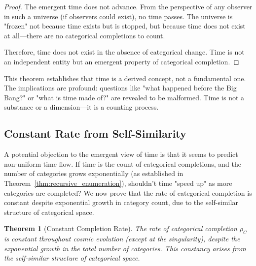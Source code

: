 \documentclass[12pt,a4paper]{article}
\newtheorem{theorem}{Theorem}[section]
\theoremstyle{definition}
\theoremstyle{remark}
\begin{document}
\begin{proof}
The emergent time does not advance. From the perspective of any observer in such a universe (if observers could exist), no time passes. The universe is "frozen" not because time exists but is stopped, but because time does not exist at all—there are no categorical completions to count.

Therefore, time does not exist in the absence of categorical change. Time is not an independent entity but an emergent property of categorical completion.
\end{proof}

This theorem establishes that time is a derived concept, not a fundamental one. The implications are profound: questions like "what happened before the Big Bang?" or "what is time made of?" are revealed to be malformed. Time is not a substance or a dimension—it is a counting process.

\subsection{Constant Rate from Self-Similarity}

A potential objection to the emergent view of time is that it seems to predict non-uniform time flow. If time is the count of categorical completions, and the number of categories grows exponentially (as established in Theorem~\ref{thm:recursive_enumeration}), shouldn't time "speed up" as more categories are completed? We now prove that the rate of categorical completion is constant despite exponential growth in category count, due to the self-similar structure of categorical space.

\begin{theorem}[Constant Completion Rate]
\label{thm:constant_rate}
The rate of categorical completion $\rho_C$ is constant throughout cosmic evolution (except at the singularity), despite the exponential growth in the total number of categories. This constancy arises from the self-similar structure of categorical space.
\end{theorem}
\end{document}
